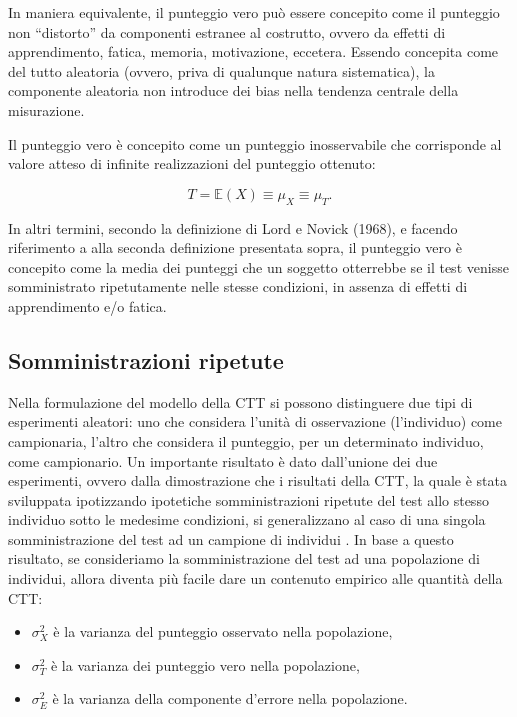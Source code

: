 \documentclass[
  11pt,
]{krantz}
\providecommand{\tightlist}{%
  \setlength{\itemsep}{0pt}\setlength{\parskip}{0pt}}
\newcommand{\E}{\mathbb{E}} %
\theoremstyle{definition}
\theoremstyle{definition}
\theoremstyle{definition}
\theoremstyle{definition}
\theoremstyle{remark}
\begin{document}
In maniera equivalente, il punteggio vero può essere concepito come il punteggio non ``distorto'' da componenti estranee al costrutto, ovvero da effetti di apprendimento, fatica, memoria, motivazione, eccetera. Essendo concepita come del tutto aleatoria (ovvero, priva di qualunque natura sistematica), la componente aleatoria non introduce dei bias nella tendenza centrale della misurazione.

Il punteggio vero è concepito come un punteggio inosservabile che corrisponde al valore atteso di infinite realizzazioni del punteggio ottenuto:

\[
T = \E(X) \equiv \mu_X \equiv \mu_{T}.
\]

In altri termini, secondo la definizione di Lord e Novick (1968), e facendo riferimento a alla seconda definizione presentata sopra, il punteggio vero è concepito come la media dei punteggi che un soggetto otterrebbe se il test venisse somministrato ripetutamente nelle stesse condizioni, in assenza di effetti di apprendimento e/o fatica.

\hypertarget{somministrazioni-ripetute}{%
\subsection{Somministrazioni ripetute}\label{somministrazioni-ripetute}}

Nella formulazione del modello della CTT si possono distinguere due tipi di esperimenti aleatori: uno che considera l'unità di osservazione (l'individuo) come campionaria, l'altro che considera il punteggio, per un determinato individuo, come campionario. Un importante risultato è dato dall'unione dei due esperimenti, ovvero dalla dimostrazione che i risultati della CTT, la quale è stata sviluppata ipotizzando ipotetiche somministrazioni ripetute del test allo stesso individuo sotto le medesime condizioni, si generalizzano al caso di una singola somministrazione del test ad un campione di individui \citep{allen2001introduction}. In base a questo risultato, se consideriamo la somministrazione del test ad una popolazione di individui, allora diventa più facile dare un contenuto empirico alle quantità della CTT:

\begin{itemize}
\tightlist
\item
  \(\sigma^2_X\) è la varianza del punteggio osservato nella popolazione,
\item
  \(\sigma^2_T\) è la varianza dei punteggio vero nella popolazione,
\item
  \(\sigma^2_E\) è la varianza della componente d'errore nella popolazione.
\end{itemize}
\end{document}
